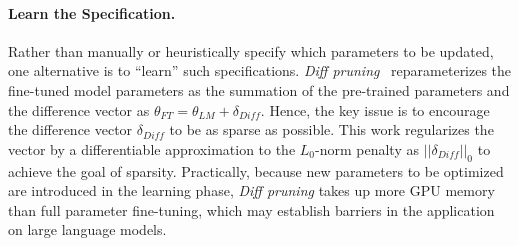 \paragraph{Learn the Specification.}
Rather than manually or heuristically specify which parameters to be updated, one alternative is to ``learn'' such specifications. \textit{Diff pruning}~\citep{DBLP:conf/acl/GuoRK20} reparameterizes the fine-tuned model parameters as the summation of the pre-trained parameters and the difference vector as $\theta_{FT} = \theta_{LM} + \delta_{Diff} $. Hence, the key issue is to encourage the difference vector $\delta_{Diff}$ to be as sparse as possible. This work regularizes the vector by a differentiable approximation to the $L_0$-norm penalty as $||\delta_{Diff}||_{0}$ to achieve the goal of sparsity. Practically, because new parameters to be optimized are introduced in the learning phase, \textit{Diff pruning} takes up more GPU memory than full parameter fine-tuning, which may establish barriers in the application on large language models. 


